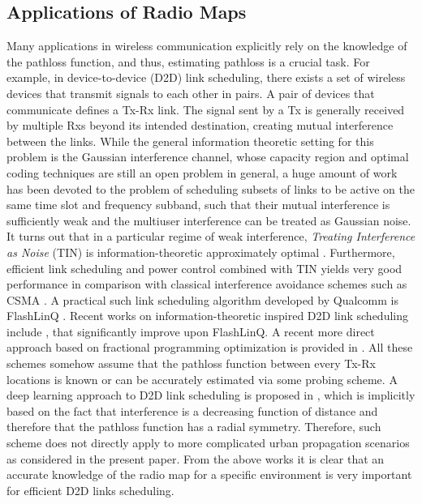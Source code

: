 \documentclass[10pt,a4paper]{article}
\begin{document}
\subsection{Applications of Radio Maps}
Many applications in wireless communication explicitly rely on the knowledge of the pathloss function, and thus, estimating pathloss is a crucial task. 
 For example, in device-to-device (D2D) link scheduling, there exists a set of wireless devices that transmit signals to each other in pairs. A pair of devices that communicate defines a Tx-Rx link. The signal sent by a Tx is generally received by multiple Rxs beyond its intended destination, creating mutual interference between the links. 
 While the general information theoretic setting for this problem is the Gaussian interference channel, whose capacity region and optimal coding techniques are still an open problem in general,
 a huge amount of work has been devoted to the problem of scheduling subsets of links to be active on the same time slot and frequency subband, such that their mutual interference is sufficiently weak and the multiuser interference can be treated as Gaussian noise. 
 It turns out that in a particular regime of weak interference, {\em Treating Interference as Noise} (TIN) is information-theoretic approximately optimal \cite{TINJafar}. Furthermore, 
 efficient link scheduling and power control combined with TIN yields very good performance
in comparison with classical interference avoidance schemes such as CSMA \cite{bianchi2000performance}. 
A practical such link scheduling algorithm developed by Qualcomm is FlashLinQ \cite{wu2013flashlinq}.
Recent works on information-theoretic inspired D2D link scheduling include \cite{naderializadeh2014itlinq,TINCaire}, 
that significantly improve upon FlashLinQ. A recent more direct approach based on fractional programming optimization
is provided in \cite{shen2017fplinq}. All these schemes somehow assume that the
pathloss function between every Tx-Rx locations is known or can be accurately estimated via some probing scheme.
A deep learning approach to D2D link scheduling is proposed in \cite{SchYu}, which is implicitly based on the fact that interference is a decreasing function of distance and therefore that the pathloss function has a radial symmetry. Therefore, such scheme does not directly apply to more complicated urban propagation scenarios as considered in the present paper. 
From the above works it is clear that an accurate knowledge of the radio map for a specific environment is very important for efficient D2D links scheduling. 
\end{document}
